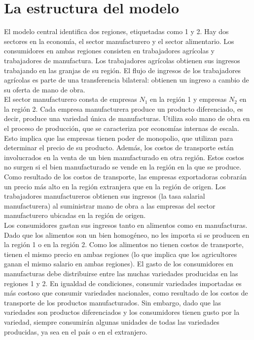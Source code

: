 \section{La estructura del modelo}
El modelo central identifica dos regiones, etiquetadas como 1 y 2. Hay dos sectores en la economía, el sector manufacturero y el sector alimentario. Los consumidores en ambas regiones consisten en trabajadores agrícolas y trabajadores de manufactura. Los trabajadores agrícolas obtienen sus ingresos trabajando en las granjas de su región. El flujo de ingresos de los trabajadores agrícolas es parte de una transferencia bilateral: obtienen un ingreso a cambio de su oferta de mano de obra.\\
El sector manufacturero consta de empresas $N_1$ en la región 1 y empresas $N_2$ en la región 2. Cada empresa manufacturera produce un producto diferenciado, es decir, produce una variedad única de manufacturas. Utiliza solo mano de obra en el proceso de producción, que se caracteriza por economías internas de escala. Esto implica que las empresas tienen poder de monopolio, que utilizan para determinar el precio de su producto. Además, los costos de transporte están involucrados en la venta de un bien manufacturado en otra región. Estos costos no surgen si el bien manufacturado se vende en la región en la que se produce. Como resultado de los costos de transporte, las empresas exportadoras cobrarán un precio más alto en la región extranjera que en la región de origen. Los trabajadores manufactureros obtienen sus ingresos (la tasa salarial manufacturera) al suministrar mano de obra a las empresas del sector manufacturero ubicadas en la región de origen.\\
Los consumidores gastan sus ingresos tanto en alimentos como en manufacturas. Dado que los alimentos son un bien homogéneo, no les importa si se producen en la región 1 o en la región 2. Como los alimentos no tienen costos de transporte, tienen el mismo precio en ambas regiones (lo que implica que los agricultores ganan el mismo salario en ambas regiones). El gasto de los consumidores en manufacturas debe distribuirse entre las muchas variedades producidas en las regiones 1 y 2. En igualdad de condiciones, consumir variedades importadas es más costoso que consumir variedades nacionales, como resultado de los costos de transporte de los productos manufacturados. Sin embargo, dado que las variedades son productos diferenciados y los consumidores tienen gusto por la variedad, siempre consumirán algunas unidades de todas las variedades producidas, ya sea en el país o en el extranjero.\\

